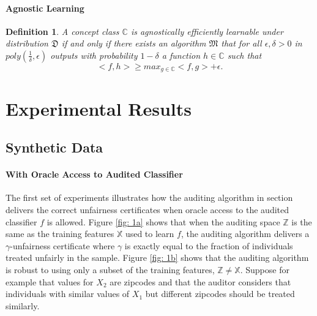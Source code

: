 \documentclass{article}
\newtheorem{defn}{Definition}[section]
\begin{document}
\paragraph{Agnostic Learning}
\begin{defn}
A concept class $\mathbb{C}$ is agnostically efficiently learnable under distribution $\mathfrak{D}$ if and only if there exists an algorithm $\mathfrak{M}$ that for all $\epsilon, \delta >0$ in $poly(\frac{1}{\delta}, \epsilon)$ outputs with probability $1-\delta$ a function $h\in \mathbb{C}$ such that
$$ <f,h> \geq max_{g\in \mathbb{C}}<f, g> + \epsilon. $$
\end{defn}

 
\section{Experimental Results}
\subsection{Synthetic Data}

\paragraph{With Oracle Access to Audited Classifier}
The first set of experiments illustrates how the auditing algorithm in section delivers the correct unfairness certificates when oracle access to the audited classifier $f$ is allowed. Figure \ref{fig: 1a} shows that when the auditing space $\mathbb{Z}$ is the same as the training features $\mathbb{X}$ used to learn $f$, the auditing algorithm delivers a $\gamma$-unfairness certificate where $\gamma$ is exactly equal to the fraction of individuals treated unfairly in the sample. Figure \ref{fig: 1b} shows that the auditing algorithm is robust to using only a subset of the training features, $\mathbb{Z} \neq \mathbb{X}$. Suppose for example that values for $X_{2}$ are zipcodes and that the auditor considers that individuals with similar values of $X_{1}$ but different zipcodes should be treated similarly. 
\end{document}
